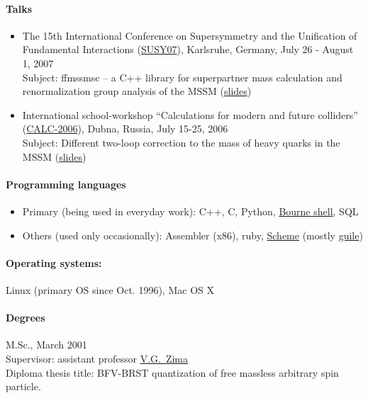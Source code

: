 \documentclass{report}
\begin{document}
\begin{itemize}
  \paragraph{Talks}
    \begin{itemize}
      \item
        The 15th International Conference on Supersymmetry and the Unification
	of Fundamental Interactions
	(\href{http://susy07.uni-karlsruhe.de}{SUSY07}), Karlsruhe, Germany,
	July 26 - August 1, 2007 \\
	Subject: ffmssmsc -- a C++ library for superpartner mass calculation and
	renormalization group analysis of the MSSM
        (\href{http://indico.cern.ch/contributionDisplay.py?contribId=419&sessionId=236&confId=6210}{slides})
      \item
        International school-workshop ``Calculations for modern and future colliders''
	(\href{http://theor.jinr.ru/~calc2006}{CALC-2006}),
	Dubna, Russia, July 15-25, 2006 \\
	Subject: Different two-loop correction to the mass of heavy quarks in the MSSM
	(\href{http://theor.jinr.ru/~calc2006/Talks/sheplyakov_cal06.pdf}{slides})
    \end{itemize}
\end{itemize}

\paragraph{Programming languages}
\begin{itemize}
\item
Primary (being used in everyday work): {\rm C++}, {\rm C}, Python,
\href{http://en.wikipedia.org/wiki/Bourne_shell}{Bourne shell}, SQL
\item
Others (used only occasionally):
Assembler (x86), ruby,
\href{http://en.wikipedia.org/wiki/Scheme_(programming_language)}{Scheme}
(mostly \href{http://www.gnu.org/software/guile}{guile})
\end{itemize}

\paragraph{Operating systems: }
Linux (primary OS since Oct. 1996), Mac OS X

\paragraph{Degrees}
M.Sc., March 2001 \\
	Supervisor: assistant professor
\href{http://www.slac.stanford.edu/spires/find/hep/www?rawcmd=FIND+A+ZIMA%2CV.G.&FORMAT=www&SEQUENCE=ds%28d%29}{\underline{V.G.~Zima}} \\
	Diploma thesis title: BFV-BRST quantization of free massless
	arbitrary spin particle.
\end{document}
